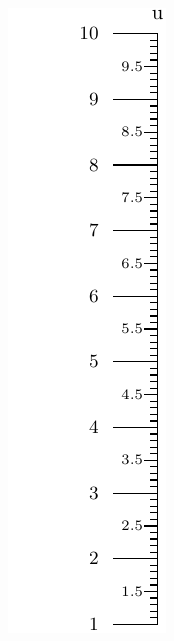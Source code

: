 \documentclass[a4paper,11pt,english]{sphinxmanual}
\begin{document}
\includegraphics{ex_axes_2.pdf}
\end{document}
